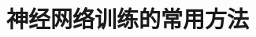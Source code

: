 \setcounter{chapter}{1}

\hypertarget{ux795eux7ecfux7f51ux7edcux8badux7ec3ux7684ux5e38ux7528ux65b9ux6cd5}{%
\chapter{神经网络训练的常用方法}\label{ux795eux7ecfux7f51ux7edcux8badux7ec3ux7684ux5e38ux7528ux65b9ux6cd5}}
